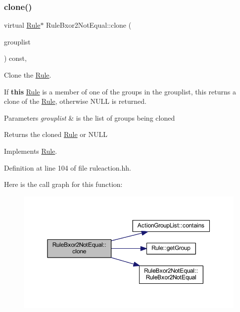 \subsubsection{\texorpdfstring{clone()}{clone()}}
{\footnotesize\ttfamily virtual \mbox{\hyperlink{class_rule}{Rule}}$\ast$ Rule\+Bxor2\+Not\+Equal\+::clone (\begin{DoxyParamCaption}\item[{const \mbox{\hyperlink{class_action_group_list}{Action\+Group\+List}} \&}]{grouplist }\end{DoxyParamCaption}) const\hspace{0.3cm}{\ttfamily [inline]}, {\ttfamily [virtual]}}



Clone the \mbox{\hyperlink{class_rule}{Rule}}. 

If {\bfseries{this}} \mbox{\hyperlink{class_rule}{Rule}} is a member of one of the groups in the grouplist, this returns a clone of the \mbox{\hyperlink{class_rule}{Rule}}, otherwise N\+U\+LL is returned. 
\begin{DoxyParams}{Parameters}
{\em grouplist} & is the list of groups being cloned \\
\hline
\end{DoxyParams}
\begin{DoxyReturn}{Returns}
the cloned \mbox{\hyperlink{class_rule}{Rule}} or N\+U\+LL 
\end{DoxyReturn}


Implements \mbox{\hyperlink{class_rule_a70de90a76461bfa7ea0b575ce3c11e4d}{Rule}}.



Definition at line 104 of file ruleaction.\+hh.

Here is the call graph for this function\+:
\nopagebreak
\begin{figure}[H]
\begin{center}
\leavevmode
\includegraphics[width=350pt]{class_rule_bxor2_not_equal_a035a4211de0556631e2f3022e56fe24d_cgraph}
\end{center}
\end{figure}
\mbox{\label{class_rule_bxor2_not_equal_a9bb1bfa0c646bd223ed71f590d803046}} 
